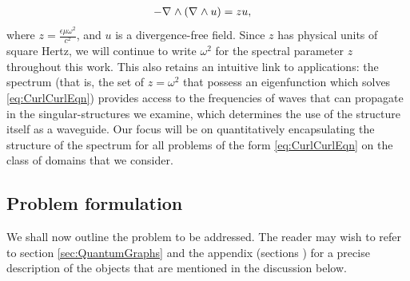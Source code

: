 \begin{align} \label{eq:CurlCurlEqn}
	- \nabla_{}\wedge\left(  \nabla_{}\wedge u  \right) &= zu,
\end{align}
where $z = \frac{\epsilon\mu\omega^2}{c^2}$, and $u$ is a divergence-free field.
Since $z$ has physical units of square Hertz, we will continue to write $\omega^2$ for the spectral parameter $z$ throughout this work.
This also retains an intuitive link to applications: the spectrum (that is, the set of $z=\omega^2$ that possess an eigenfunction which solves \eqref{eq:CurlCurlEqn}) provides access to the frequencies of waves that can propagate in the singular-structures we examine, which determines the use of the structure itself as a waveguide.
Our focus will be on quantitatively encapsulating the structure of the spectrum for all problems of the form \eqref{eq:CurlCurlEqn} on the class of domains that we consider.

\subsection{Problem formulation} \label{ssec:OurSystem}
We shall now outline the problem to be addressed.
The reader may wish to refer to section \ref{sec:QuantumGraphs} and the appendix (sections ) for a precise description of the objects that are mentioned in the discussion below. 

